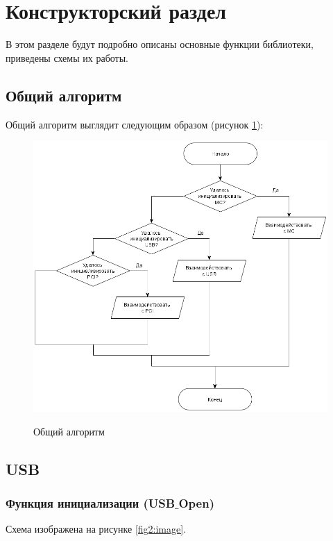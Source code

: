 \newpage
\section{Конструкторский раздел}
В этом разделе будут подробно описаны основные функции библиотеки, приведены схемы их работы.

	\subsection{Общий алгоритм}
	Общий алгоритм выглядит следующим образом (рисунок \ref{fig1:image}):
	
	\begin{figure}[ph!]
		\centering
		\begin{center}
			{\includegraphics[scale=0.5]{schemes/general.png}}
			\caption{Общий алгоритм}
			\label{fig1:image}
		\end{center}
	\end{figure}


	\subsection{USB}
	\subsubsection{Функция инициализации (USB$\_$Open)}
	
	Схема изображена на рисунке \ref{fig2:image}.
	
